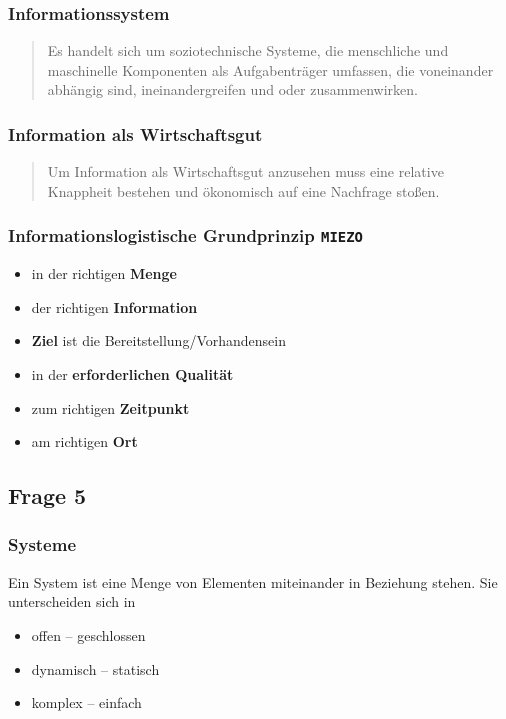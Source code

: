 \documentclass[a4paper]{article}
\begin{document}
			\subsubsection{Informationssystem}
			\begin{quote}
				Es handelt sich um soziotechnische Systeme, die menschliche und maschinelle Komponenten als Aufgabenträger umfassen, die voneinander abhängig sind, ineinandergreifen und oder zusammenwirken.
			\end{quote}
			\hrulefill
			\subsubsection{Information als Wirtschaftsgut}
			\begin{quote}
				Um Information als Wirtschaftsgut anzusehen muss eine relative Knappheit bestehen und ökonomisch auf eine Nachfrage stoßen.
			\end{quote}
			\hrulefill
			
			
			\subsubsection{Informationslogistische Grundprinzip \texttt{MIEZO}}
			\begin{itemize}
				\item in der richtigen \textbf{Menge}
				\item der richtigen \textbf{Information}
				\item \textbf{Ziel} ist die Bereitstellung/Vorhandensein
				\item in der \textbf{erforderlichen Qualität} 
				\item zum richtigen \textbf{Zeitpunkt} 
				\item am richtigen \textbf{Ort}
			\end{itemize}
			
			\subsection{Frage 5}
			\label{le1-5}
			\subsubsection{Systeme}
			Ein System ist eine Menge von Elementen miteinander in Beziehung stehen. Sie unterscheiden sich in
			\begin{itemize}
				\item offen -- geschlossen
				\item dynamisch -- statisch
				\item komplex -- einfach
			\end{itemize}
			\hrulefill
			
\end{document}

